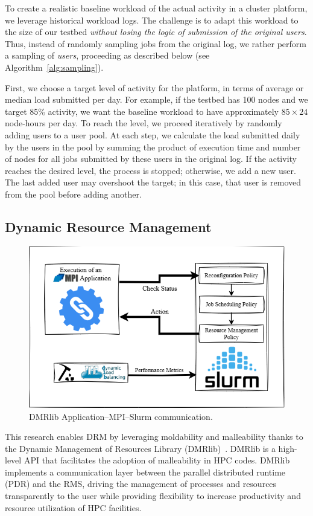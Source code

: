 \documentclass[a4paper,fleqn]{cas-dc}
\begin{document}
To create a realistic baseline workload of the actual activity in a cluster platform,
we leverage historical workload logs.
The challenge is to adapt this workload to the size of our testbed
\textit{without losing the logic of submission of the original users}.
Thus, instead of randomly sampling jobs from the original log,
we rather perform a sampling of \textit{users}, 
proceeding as described below (see Algorithm~\ref{alg:sampling}). 

First, we choose a target level of activity for the platform,
in terms of average or median load submitted per day.
For example, if the testbed has 100 nodes and we target 85\% activity,
we want the baseline workload to have approximately $85\times 24$ node-hours per day.
To reach the level, we proceed iteratively by randomly adding users to a user pool.
At each step, we calculate the load submitted daily by the users in the pool
by summing the product of execution time and number of nodes for all jobs submitted by these users in the original log.
If the activity reaches the desired level, the process is stopped; 
otherwise, we add a new user.
The last added user may overshoot the target;
in this case, that user is removed from the pool before adding another.

\subsection{Dynamic Resource Management}\label{subsec:dmr}

\begin{figure}
\centering
    \includegraphics[clip,width=0.8\linewidth,trim={1.2cm 1.2cm 1.2cm 0.25cm}]{figures/dmr-slurm2.png}
    \caption{DMRlib Application--MPI--Slurm communication.}
    \label{fig:dmr-slurm}
\end{figure}

This research enables DRM by leveraging moldability and malleability thanks to the Dynamic Management of Resources Library (DMRlib)~\cite{iserte_dmrlib_2020}.
DMRlib is a high-level API that facilitates the adoption of malleability in HPC codes. 
DMRlib implements a communication layer between the parallel distributed runtime (PDR) and the RMS, driving the management of processes and resources transparently to the user while providing flexibility to increase productivity and resource utilization of HPC facilities.
\end{document}
